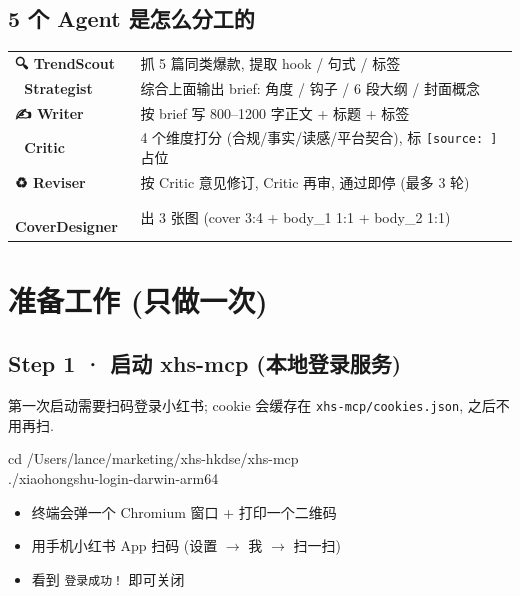 \documentclass[11pt,a4paper]{article}
\begin{document}
\subsection{5 个 Agent 是怎么分工的}

\begin{tcolorbox}[colback=xhsBg, colframe=xhsRed!50, arc=2mm, breakable]
\small
\begin{tabular}{p{3.4cm} p{12cm}}
\textbf{🔍 TrendScout} & 抓 5 篇同类爆款, 提取 hook / 句式 / 标签\\
\textbf{🎯 Strategist} & 综合上面输出 brief: 角度 / 钩子 / 6 段大纲 / 封面概念\\
\textbf{✍️ Writer} & 按 brief 写 800–1200 字正文 + 标题 + 标签\\
\textbf{🔬 Critic} & 4 个维度打分 (合规/事实/读感/平台契合), 标 \texttt{[source: ]} 占位\\
\textbf{♻️ Reviser} & 按 Critic 意见修订, Critic 再审, 通过即停 (最多 3 轮)\\
\textbf{🎨 CoverDesigner} & 出 3 张图 (cover 3:4 + body\_1 1:1 + body\_2 1:1)\\
\end{tabular}
\end{tcolorbox}

\section{准备工作 (只做一次)}

\subsection{Step 1 · 启动 xhs-mcp (本地登录服务)}

第一次启动需要扫码登录小红书; cookie 会缓存在 \texttt{xhs-mcp/cookies.json}, 之后不用再扫.

\begin{cmdbox}
cd /Users/lance/marketing/xhs-hkdse/xhs-mcp\\
./xiaohongshu-login-darwin-arm64
\end{cmdbox}

\begin{itemize}[leftmargin=*]
  \item 终端会弹一个 Chromium 窗口 + 打印一个二维码
  \item 用手机小红书 App 扫码 (设置 \(\to\) 我 \(\to\) 扫一扫)
  \item 看到 \texttt{登录成功！} 即可关闭
\end{itemize}
\end{document}
